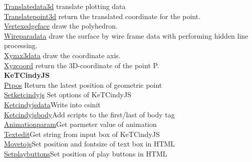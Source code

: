 \documentclass[papersize,a4paper,12pt]{article}
\begin{document}
\begin{tabbing}
\hyperlink{translatedata3d}{Translatedata3d} \> translate plotting data\\
\hyperlink{translatepoint3d}{Translatepoint3d} \> return the translated coordinate for the point.\\\hyperlink{vertexedgeface}{Vertexedgeface} \> draw the polyhedron.\\
\hyperlink{wireparadata}{Wireparadata} \> draw the surface by wire frame data with performing hidden line processing.\\
\hyperlink{xyzax3data}{Xyzax3data} \> draw the coordinate axis.\\
\hyperlink{xyzcoord}{Xyzcoord} \> return the 3D-coordinate of the point P.\\
{\bf KeTCindyJS} \> \\
\hyperlink{ptpos}{Ptpos} \>Return the latest position of geometric point\\
\hyperlink{setketcindyjs}{Setketcindyjs} \>Set options of KeTCindyJS\\
\hyperlink{ketcindyjsdata}{Ketcindyjsdata}\>Write into csinit\\
\hyperlink{ketcindyjsbody}{Ketcindyjsbody}\>Add scripts to the first/last of body tag\\
\hyperlink{animationparam}{Animationparam}\>Get parmeter value of animation\\
\hyperlink{textedit}{Textedit}\>Get string from input box of KeTCindyJS\\
\hyperlink{movetojs}{Movetojs}\>Set position and fontsize of text box in HTML\\
\hyperlink{setplaybuttons}{Setplaybuttons}\>Set position of play buttons in HTML\\
\end{tabbing}
\end{document}
